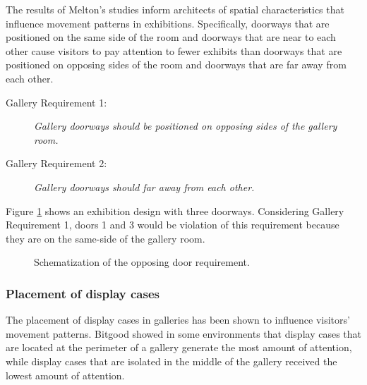 \documentclass[12pt]{ucthesis}
\begin{document}
The results of Melton's studies inform architects of spatial characteristics that influence movement patterns in exhibitions. Specifically, doorways that are positioned on the same side of the room and doorways that are near to each other cause visitors to pay attention to fewer exhibits than doorways that are positioned on opposing sides of the room and doorways that are far away from each other.

\begin{description}
\item[Gallery Requirement 1:] \emph{Gallery doorways should be positioned on opposing sides of the gallery room.} 
\item[Gallery Requirement 2:] \emph{Gallery doorways should far away from each other.} 
\end{description}

Figure \ref{door-position} shows an exhibition design with three doorways. Considering Gallery Requirement 1, doors 1 and 3 would be violation of this requirement because they are on the same-side of the gallery room.
\begin{figure}[H]
\centering
{}
\caption{Schematization of the opposing door requirement.}
\label{door-position}
\end{figure} 


\subsubsection{Placement of display cases}
The placement of display cases in galleries has been shown to influence visitors' movement patterns. Bitgood \cite{Bitgood92} showed in some environments that display cases that are located at the perimeter of a gallery generate the most amount of attention, while display cases that are isolated in the middle of the gallery received the lowest amount of attention.
\end{document}

